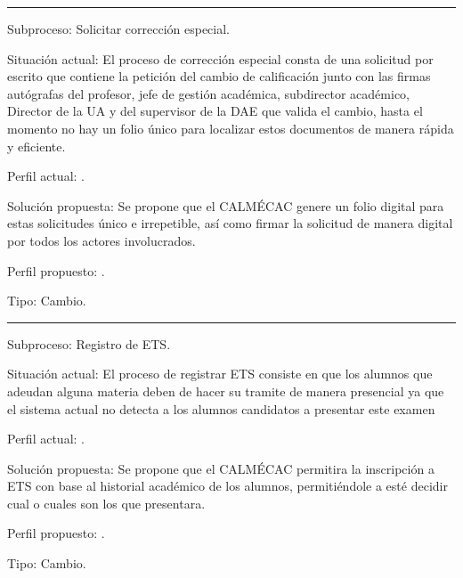 \hrule
\vspace{0.2cm}
\begin{Cdescription}
	
	\item[Subproceso:]Solicitar corrección especial.
	\item[Situación actual:]El proceso de corrección especial consta de una solicitud por escrito que contiene la petición del cambio de calificación junto con las firmas autógrafas del profesor, jefe de gestión académica, subdirector académico, Director de la UA y del supervisor de la DAE que valida el cambio, hasta el momento no hay un folio único para localizar estos documentos de manera rápida y eficiente.
	\item[Perfil actual:]  .
	\item[Solución propuesta:] Se propone que el CALMÉCAC genere un folio digital para estas solicitudes único e irrepetible, así como firmar la solicitud de manera digital por todos los actores involucrados.
	\item[Perfil propuesto:]  .
	\item[Tipo:] Cambio.\\
	
\end{Cdescription} 

\hrule
\vspace{0.2cm}
\begin{Cdescription}
	\item[Subproceso:]Registro de ETS.
	\item[Situación actual:]El proceso de registrar ETS consiste en que los alumnos que adeudan alguna materia deben de hacer su tramite de manera presencial ya que el sistema actual no detecta a los alumnos candidatos a presentar este examen  
	\item[Perfil actual:] .
	\item[Solución propuesta:] Se propone que el CALMÉCAC permitira la inscripción a ETS con base al historial académico de los alumnos, permitiéndole a esté decidir cual o cuales son los que presentara.
	\item[Perfil propuesto:] .
	\item[Tipo:] Cambio.\\
	
\end{Cdescription} 
%


